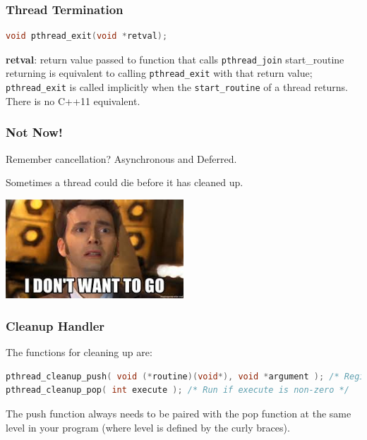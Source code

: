 \begin{frame}[fragile]
  \frametitle{Thread Termination}


  \begin{lstlisting}[language=C]
void pthread_exit(void *retval);
  \end{lstlisting}
  \vfill
  {\bf retval}: return value passed to function that calls {\tt pthread\_join}
  \vfill
  start\_routine returning is equivalent to calling {\tt pthread\_exit} with
  that return value;
  \vfill
  {\tt pthread\_exit} is called implicitly when the {\tt start\_routine} of a
  thread returns.
  \vfill
  There is no C++11 equivalent.


\end{frame}



\begin{frame}
\frametitle{Not Now!}

Remember cancellation? Asynchronous and Deferred.

Sometimes a thread could die before it has cleaned up.

\begin{center}
	\includegraphics[width=0.5\textwidth]{images/tenthdoctor.jpeg}
\end{center}


\end{frame}


\begin{frame}[fragile]
\frametitle{Cleanup Handler}

The functions for cleaning up are:

\begin{lstlisting}[language=C]
pthread_cleanup_push( void (*routine)(void*), void *argument ); /* Register cleanup handler, with argument */ 
pthread_cleanup_pop( int execute ); /* Run if execute is non-zero */ 
\end{lstlisting}

The push function always needs to be paired with the pop function at the same level in your program (where level is defined by the curly braces).

\end{frame}


